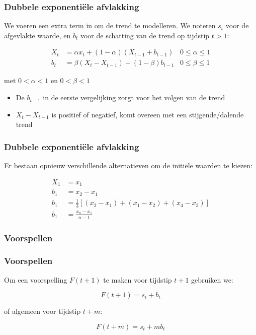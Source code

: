 \documentclass[aspectratio=169]{beamer}
\begin{document}
\begin{frame}
  \frametitle{Dubbele exponentiële afvlakking}
  
  We voeren een extra term in om de trend te modelleren. We noteren $s_t$ voor de afgevlakte waarde, en $b_t$ voor de schatting van de trend op tijdstip $t > 1$:
  
  \begin{align*}
  X_{t} & = \alpha x_{t} + (1-\alpha)(X_{t-1} + b_{t-1}) & 0 \leq \alpha \leq 1                            \\
  b_{t} & = \beta(X_{t}-X_{t-1}) + (1-\beta)b_{t-1}      & 0 \leq \beta \leq 1 
  \label{eq:doubleSmoothing}
  \end{align*}
  
  met $0 < \alpha < 1$ en $0 < \beta < 1$
  
  
  \begin{itemize}
    \item De $b_{t-1}$ in de eerste vergelijking zorgt voor het volgen van de trend
    \item $X_{t}-X_{t-1}$ is positief of negatief, komt overeen met een stijgende/dalende trend
  \end{itemize}
\end{frame}

\begin{frame}
  \frametitle{Dubbele exponentiële afvlakking}
  Er bestaan opnieuw verschillende alternatieven om de initiële waarden te kiezen:
  
  \begin{align*}
  X_{1} &= x_{1} \\
  b_{1} &= x_{2} - x_{1} \\
  b_{1} &= \frac{1}{3}\left[ (x_{2} - x_{1}) + (x_{1} - x_{2}) + (x_{4} - x_{3}) \right]\\
  b_{1} &= \frac{x_{n} - x_{1}}{n-1}
  \end{align*}
  
\end{frame}

\subsubsection{Voorspellen}

\begin{frame}
  \frametitle{Voorspellen}
  
  Om een voorspelling $F(t+1)$ te maken voor tijdstip $t+1$ gebruiken we:
  
  \[ F(t+1) = s_t + b_t \]
  
  of algemeen voor tijdstip $t+m$:
  
  \[ F(t+m) = s_t + m b_t \]
\end{frame}
\end{document}
